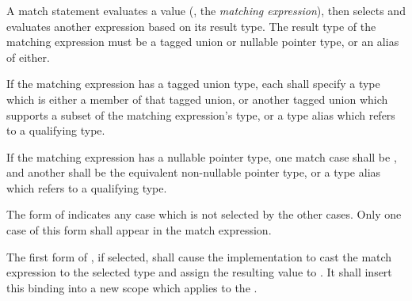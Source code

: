 \begin{grammar}
 \\
	 \terminal{(}  \terminal{)} \terminal{\{}  \terminal{\}} \\

 \\
	 \optional{\terminal{,}} \\
	 \terminal{,}  \\

 \\
	 \terminal{:}  \terminal{=>}  \\
	\terminal{\_} \terminal{:}  \terminal{=>}  \\
	 \terminal{=>}  \\
	\terminal{*} \terminal{=>}  \\
\end{grammar}

\specsubsubitem
A match statement evaluates a value (, the
\textit{matching expression}), then selects and evaluates another expression
based on its result type. The result type of the matching expression must be a
tagged union or nullable pointer type, or an alias of either.

\specsubsubitem
If the matching expression has a tagged union type, each
 shall specify a type which is either a member of that
tagged union, or another tagged union which supports a subset of the matching
expression's type, or a type alias which refers to a qualifying type.

\specsubsubitem
If the matching expression has a nullable pointer type, one match case shall be
, and another shall be the equivalent non-nullable pointer type,
or a type alias which refers to a qualifying type.

\specsubsubitem
The \terminal{*} form of  indicates any case which is
not selected by the other cases. Only one case of this form shall appear in the
match expression.

\specsubsubitem
The first form of , if selected, shall cause the
implementation to cast the match expression to the selected type and assign the
resulting value to . It shall insert this binding into a new
scope which applies to the .

